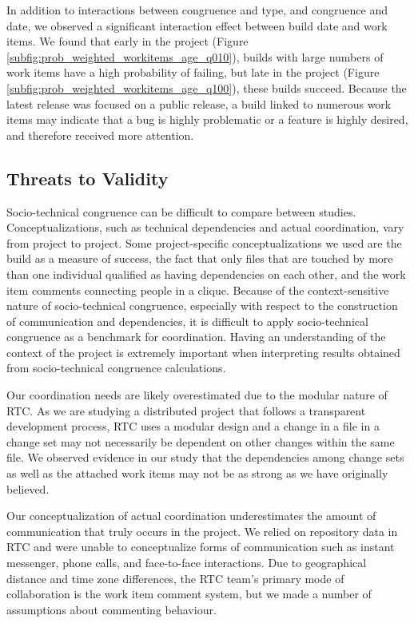 In addition to interactions between congruence and type, and congruence and date, we observed a significant interaction effect between build date and work items.
We found that early in the project (Figure \ref{subfig:prob_weighted_workitems_age_q010}), builds with large numbers of work items have a high probability of failing, but late in the project (Figure \ref{subfig:prob_weighted_workitems_age_q100}), these builds succeed. Because the latest release was focused on a public release, a build linked to numerous work items may indicate that a bug is highly problematic or a feature is highly desired, and therefore received more attention. 


\subsection{Threats to Validity}
\label{sec:threats}
Socio-technical congruence can be difficult to compare between studies. Conceptualizations, such as technical dependencies and actual coordination, vary from project to project. Some project-specific conceptualizations we used are the build as a measure of success, the fact that only files that are touched by more than one individual qualified as having dependencies on each other, and the work item comments connecting people in a clique.
Because of the context-sensitive nature of socio-technical congruence, especially with respect to the construction of communication and dependencies, it is difficult to apply socio-technical congruence as a benchmark for coordination. Having an understanding of the context of the project is extremely important when interpreting results obtained from socio-technical congruence calculations.

Our coordination needs are likely overestimated due to the modular nature of RTC.
As we are studying a distributed project that follows a transparent development process, RTC uses a modular design \cite{maccormack2006} and a change in a file in a change set may not necessarily be dependent on other changes within the same file. 
We observed evidence in our study that the dependencies among change sets as well as the attached work items may not be as strong as we have originally believed.

Our conceptualization of actual coordination underestimates the amount of communication that truly occurs in the project. 
We relied on repository data in RTC and were unable to conceptualize forms of communication such as instant messenger, phone calls, and face-to-face interactions.
Due to geographical distance and time zone differences, the RTC team's primary mode of collaboration is the work item comment system, but we made a number of assumptions about commenting behaviour.


